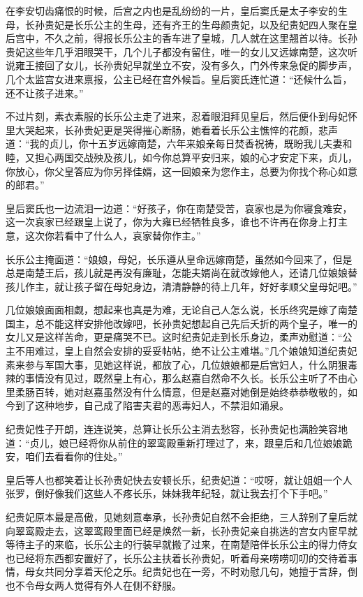 在李安切齿痛恨的时候，后宫之内也是乱纷纷的一片，皇后窦氏是太子李安的生母，长孙贵妃是长乐公主的生母，还有齐王的生母颜贵妃，以及纪贵妃四人聚在皇后宫中，不久之前，得报长乐公主的香车进了皇城，几人就在这里翘首以待。长孙贵妃这些年几乎泪眼哭干，几个儿子都没有留住，唯一的女儿又远嫁南楚，这次听说雍王接回了女儿，长孙贵妃早就坐立不安，没有多久，门外传来急促的脚步声，几个太监宫女进来禀报，公主已经在宫外候旨。皇后窦氏连忙道：“还候什么旨，还不让孩子进来。”

不过片刻，素衣素服的长乐公主走了进来，忍着眼泪拜见皇后，然后便仆到母妃怀里大哭起来，长孙贵妃更是哭得摧心断肠，她看着长乐公主憔悴的花颜，悲声道：“我的贞儿，你十五岁远嫁南楚，六年来娘亲每日焚香祝祷，既盼我儿夫妻和睦，又担心两国交战殃及孩儿，如今你总算平安归来，娘的心才安定下来，贞儿，你放心，你父皇答应为你另择佳婿，这一回娘亲为您作主，总要为你找个称心如意的郎君。”

皇后窦氏也一边流泪一边道：“好孩子，你在南楚受苦，哀家也是为你寝食难安，这一次哀家已经跟皇上说了，你为大雍已经牺牲良多，谁也不许再在你身上打主意，这次你若看中了什么人，哀家替你作主。”

长乐公主掩面道：“娘娘，母妃，长乐遵从皇命远嫁南楚，虽然如今回来了，但是总是南楚王后，孩儿就是再没有廉耻，怎能夫婿尚在就改嫁他人，还请几位娘娘替孩儿作主，就让孩子留在母妃身边，清清静静的待上几年，好好孝顺父皇母妃吧。”

几位娘娘面面相觑，想起来也真是为难，无论自己人怎么说，长乐终究是嫁了南楚国主，总不能这样安排他改嫁吧，长孙贵妃想起自己先后夭折的两个皇子，唯一的女儿又是这样苦命，更是痛哭不已。这时纪贵妃走到长乐身边，柔声劝慰道：“公主不用难过，皇上自然会安排的妥妥帖帖，绝不让公主难堪。”几个娘娘知道纪贵妃素来参与军国大事，见她这样说，都放了心，几位娘娘都是后宫妇人，什么阴狠毒辣的事情没有见过，既然皇上有心，那么赵嘉自然命不久长。长乐公主听了不由心里柔肠百转，她对赵嘉虽然没有什么情意，但是赵嘉对她倒是始终恭恭敬敬的，如今到了这种地步，自己成了陷害夫君的恶毒妇人，不禁泪如涌泉。

纪贵妃性子开朗，连连说笑，总算让长乐公主消去愁容，长孙贵妃也满脸笑容地道：“贞儿，娘已经将你从前住的翠鸾殿重新打理过了，来，跟皇后和几位娘娘跪安，咱们去看看你的住处。”

皇后等人也都笑着让长孙贵妃快去安顿长乐，纪贵妃道：“哎呀，就让姐姐一个人张罗，倒好像我们这些人不疼长乐，妹妹我年纪轻，就让我去打个下手吧。”

纪贵妃原本最是高傲，见她刻意奉承，长孙贵妃自然不会拒绝，三人辞别了皇后就向翠鸾殿走去，这翠鸾殿里面已经是焕然一新，长孙贵妃亲自挑选的宫女内宦早就等待主子的来临，长乐公主的行装早就搬了过来，在南楚陪伴长乐公主的得力侍女也已经将东西都安置好了，长乐公主扶着长孙贵妃，听着母亲唠唠叨叨的交待着事情，母女共同分享着天伦之乐。纪贵妃也在一旁，不时劝慰几句，她擅于言辞，倒也不令母女两人觉得有外人在侧不舒服。

